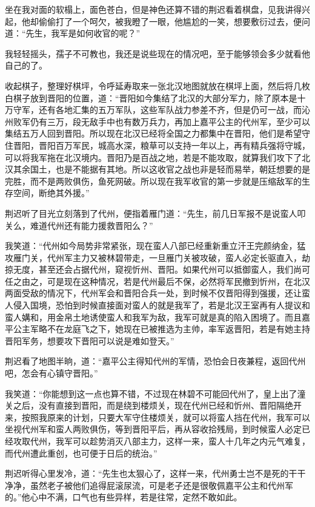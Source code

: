坐在我对面的软榻上，面色苍白，但是神色还算不错的荆迟看着棋盘，见我讲得兴起，他却偷偷打了一个呵欠，被我瞪了一眼，他尴尬的一笑，想要敷衍过去，便问道：“先生，我军是如何收官的呢？”

我轻轻摇头，孺子不可教也，我还是说些现在的情况吧，至于能够领会多少就看他自己的了。

收起棋子，整理好棋坪，令呼延寿取来一张北汉地图就放在棋坪上面，然后将几枚白棋子放到晋阳的位置，道：“晋阳如今集结了北汉的大部分军力，除了原本是十万守军，还有各地汇集的五万军队，这些军队战力参差不齐，但是仍可一战，而沁州败军仍有三万，段无敌手中也有数万兵力，再加上嘉平公主的代州军，至少可以集结五万人回到晋阳。所以现在北汉已经将全国之力都集中在晋阳，他们是希望守住晋阳，晋阳百万军民，城高水深，粮草可以支持一年以上，再有精兵强将守城，可以将我军拖在北汉境内。晋阳乃是百战之地，若是不能攻取，就算我们攻下了北汉其余国土，也是不能据有其地。所以这收官之战也非是轻而易举，朝廷想要的是完胜，而不是两败俱伤，鱼死网破。所以现在我军收官的第一步就是压缩敌军的生存空间，断绝其外援。”

荆迟听了目光立刻落到了代州，便指着雁门道：“先生，前几日军报不是说蛮人叩关么，难道代州还有能力援救晋阳么？”

我笑道：“代州如今局势非常紧张，现在蛮人八部已经重新重立汗王完颜纳金，猛攻雁门关，代州军主力又被林碧带走，一旦雁门关被攻破，蛮人必定长驱直入，劫掠无度，甚至还会占据代州，窥视忻州、晋阳。如果代州可以抵御蛮人，我们尚可任之由之，可是现在这种情况，若是代州最后不保，必然将军民撤到忻州，在北汉两面受敌的情况下，代州军会和晋阳合兵一处，到时候不仅晋阳得到强援，还让蛮人侵入国境，恐怕到时候直接面对蛮人的就是我军了，若是北汉王室再有人提议和蛮人媾和，用金帛土地诱使蛮人和我军为敌，我军可就是真的陷入困境了。而且嘉平公主军略不在龙庭飞之下，她现在已被推选为主帅，率军返晋阳，若是有她主持晋阳军务，想要攻下晋阳可以说是难如登天。”

荆迟看了地图半晌，道：“嘉平公主得知代州的军情，恐怕会日夜兼程，返回代州吧，怎会有心镇守晋阳。”

我笑道：“你能想到这一点也算不错，不过现在林碧不可能回代州了，皇上出了潼关之后，没有直接到晋阳，而是绕到楼烦关，现在代州已经和忻州、晋阳隔绝开来，按照我原来的计划，只要大军守住楼烦关，就可以将蛮人挡在代州，我军可以坐视代州军和蛮人两败俱伤，等到晋阳平后，再从容收拾残局，到时候蛮人必定已经攻取代州，我军可以趁势消灭八部主力，这样一来，蛮人十几年之内元气难复，而代州遭此重创，也可便于日后的统治。”

荆迟听得心里发冷，道：“先生也太狠心了，这样一来，代州勇士岂不是死的干干净净，虽然老子被他们追得屁滚尿流，可是老子还是很敬佩嘉平公主和代州军的。”他心中不满，口气也有些异样，若是往常，定然不敢如此。

